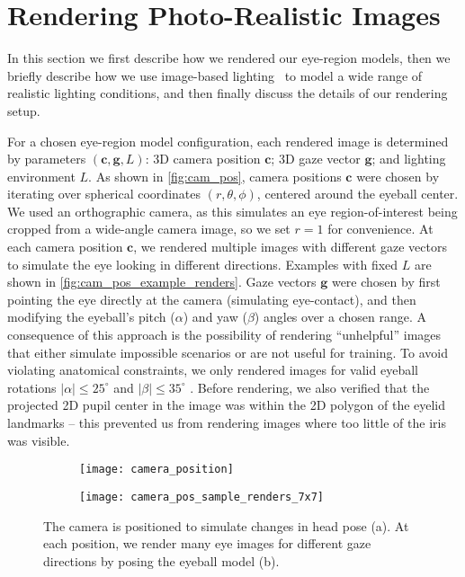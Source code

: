 
\section{Rendering Photo-Realistic Images}


In this section we first describe how we rendered our eye-region models, then we briefly describe how we use image-based lighting~\cite{debevec2002image} to model a wide range of realistic lighting conditions, and then finally discuss the details of our rendering setup.

For a chosen eye-region model configuration, each rendered image is determined by parameters $(\mathbf{c}, \mathbf{g}, L)$: 3D camera position $\mathbf{c}$; 3D gaze vector $\mathbf{g}$; and lighting environment $L$.
As shown in \autoref{fig:cam_pos}, camera positions $\mathbf{c}$ were chosen by iterating over spherical coordinates $(r, \theta, \phi)$, centered around the eyeball center.
We used an orthographic camera, as this simulates an eye region-of-interest being cropped from a wide-angle camera image, so we set $r\!=\!1$ for convenience.
At each camera position $\mathbf{c}$, we rendered multiple images with different gaze vectors to simulate the eye looking in different directions.
Examples with fixed $L$ are shown in \autoref{fig:cam_pos_example_renders}.
Gaze vectors $\mathbf{g}$ were chosen by first pointing the eye directly at the camera (simulating eye-contact), and then modifying the eyeball's pitch ($\alpha$) and yaw ($\beta$) angles over a chosen range.
%
A consequence of this approach is the possibility of rendering ``unhelpful'' images that either simulate impossible scenarios or are not useful for training.
To avoid violating anatomical constraints, we only rendered images for valid eyeball rotations $|\alpha|\!\leq\!25^{\circ}$ and $|\beta|\!\leq\!35^{\circ}$ \cite{MIL-STD-1472G}.
Before rendering, we also verified that the projected 2D pupil center in the image was within the 2D polygon of the eyelid landmarks -- this prevented us from rendering images where too little of the iris was visible.

\begin{figure}
    \centering
    \begin{subfigure}[t]{0.48\columnwidth}
        \texttt{[image: camera\_position]}
        \caption{}
        \label{fig:cam_pos_spher_coords}
    \end{subfigure}
    \hfill
    \begin{subfigure}[t]{0.48\columnwidth}
        \texttt{[image: camera\_pos\_sample\_renders\_7x7]}
        \caption{}
        \label{fig:cam_pos_example_renders}
    \end{subfigure}
    \caption{The camera is positioned to simulate changes in head pose (a). At each position, we render many eye images for different gaze directions by posing the eyeball model (b).}
    \label{fig:cam_pos}
\end{figure}

